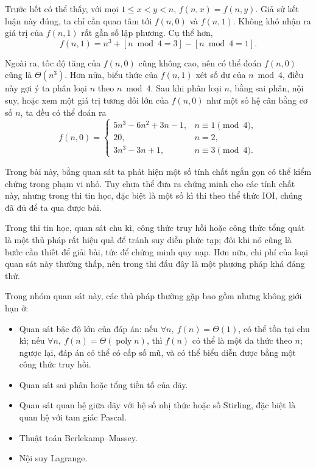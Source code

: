 \documentclass[11pt]{article}
\begin{document}
Trước hết có thể thấy, với mọi \(1\le x<y<n\), \(f(n,x)=f(n,y)\). Giả sử kết
luận này đúng, ta chỉ cần quan tâm tới \(f(n,0)\) và \(f(n,1)\). Không khó
nhận ra giá trị của \(f(n,1)\) rất gần số lập phương. Cụ thể hơn,
\[
  f(n,1)=n^3+[n\bmod 4=3]-[n\bmod 4=1].
\]

Ngoài ra, tốc độ tăng của \(f(n,0)\) cũng không cao, nên có thể đoán
\(f(n,0)\) cũng là \(\Theta(n^3)\). Hơn nữa, biểu thức của \(f(n,1)\) xét số
dư của \(n\bmod 4\), điều này gợi ý ta phân loại \(n\) theo \(n\bmod 4\). Sau
khi phân loại \(n\), bằng sai phân, nội suy, hoặc xem một giá trị tương đối
lớn của \(f(n,0)\) như một số hệ cân bằng cơ số \(n\), ta đều có thể đoán ra
\[
f(n,0)=
\begin{cases}
5n^3-6n^2+3n-1, & n\equiv 1\pmod 4,\\
20, & n=2,\\
3n^3-3n+1, & n\equiv 3\pmod 4.
\end{cases}
\]

Trong bài này, bằng quan sát ta phát hiện một số tính chất ngắn gọn có thể
kiểm chứng trong phạm vi nhỏ. Tuy chưa thể đưa ra chứng minh cho các tính chất
này, nhưng trong thi tin học, đặc biệt là một số kì thi theo thể thức IOI,
chúng đã đủ để ta qua được bài.

Trong thi tin học, quan sát chu kì, công thức truy hồi hoặc công thức tổng
quát là một thủ pháp rất hiệu quả để tránh suy diễn phức tạp; đôi khi nó cũng
là bước cần thiết để giải bài, tức để chứng minh quy nạp. Hơn nữa, chi phí
của loại quan sát này thường thấp, nên trong thi đấu đây là một phương pháp
khá đáng thử.

Trong nhóm quan sát này, các thủ pháp thường gặp bao gồm nhưng không giới hạn
ở:

\begin{itemize}
\item Quan sát bậc độ lớn của đáp án:
  nếu \(\forall n,\ f(n)=\Theta(1)\), có thể tồn tại chu kì; nếu
  \(\forall n,\ f(n)=\Theta(\operatorname{poly} n)\), thì \(f(n)\) có thể là
  một đa thức theo \(n\); ngược lại, đáp án có thể có cấp số mũ, và có thể biểu
  diễn được bằng một công thức truy hồi.
\item Quan sát sai phân hoặc tổng tiền tố của dãy.
\item Quan sát quan hệ giữa dãy với hệ số nhị thức hoặc số Stirling, đặc biệt
là quan hệ với tam giác Pascal.
\item Thuật toán Berlekamp--Massey.
\item Nội suy Lagrange.
\end{itemize}
\end{document}
